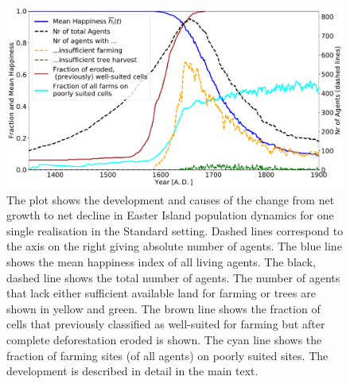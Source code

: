 \begin{figure}
	\centering
	\includegraphics[width=\textwidth]{images/Results/Standard/STDsecondaryStats}
	\caption{The plot shows the development and causes of the change from net growth to net decline in Easter Island population dynamics for one single realisation in the Standard setting.
	Dashed lines correspond to the axis on the right giving absolute number of agents.
	The blue line shows the mean happiness index of all living agents. The black, dashed line shows the total number of agents. The number of agents that lack either sufficient available land for farming or trees are shown in yellow and green. The brown line shows the fraction of cells that previously classified as well-suited for farming but after complete deforestation eroded is shown. The cyan line shows the fraction of farming sites (of all agents) on poorly suited sites.
	The development is described in detail in the main text.}
	\label{fig:STDsecondayrstats}
\end{figure}





